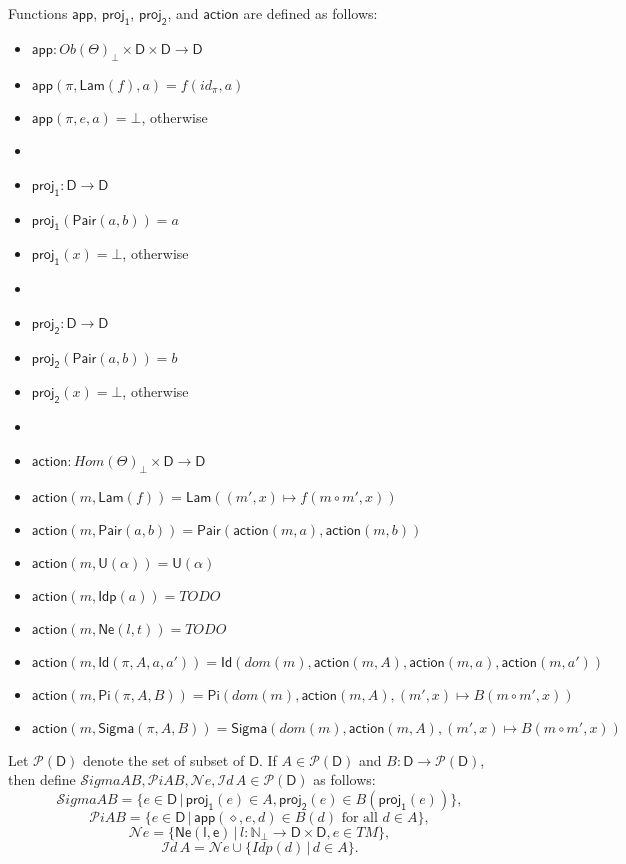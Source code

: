 \documentclass{amsart}
\theoremstyle{definition}
\theoremstyle{remark}
\newcommand{\D}{\mathsf{D}}
\newcommand{\nats}{\mathbb{N}}
\numberwithin{table}{section}
\begin{document}
Functions $\mathsf{app}$, $\mathsf{proj_1}$, $\mathsf{proj_2}$, and $\mathsf{action}$ are defined as follows:
\begin{itemize}
\item[] $\mathsf{app} : Ob(\Theta)_\bot \times \D \times \D \to \D$
\item[] $\mathsf{app}(\pi,\mathsf{Lam}(f),a) = f(id_\pi,a)$
\item[] $\mathsf{app}(\pi,e,a) = \bot$, otherwise
\item[]
\item[] $\mathsf{proj_1} : \D \to \D$
\item[] $\mathsf{proj_1}(\mathsf{Pair}(a,b)) = a$
\item[] $\mathsf{proj_1}(x) = \bot$, otherwise
\item[]
\item[] $\mathsf{proj_2} : \D \to \D$
\item[] $\mathsf{proj_2}(\mathsf{Pair}(a,b)) = b$
\item[] $\mathsf{proj_2}(x) = \bot$, otherwise
\item[]
\item[] $\mathsf{action} : Hom(\Theta)_\bot \times \D \to \D$
\item[] $\mathsf{action}(m, \mathsf{Lam}(f)) = \mathsf{Lam}((m',x) \mapsto f(m \circ m', x))$
\item[] $\mathsf{action}(m, \mathsf{Pair}(a, b)) = \mathsf{Pair}(\mathsf{action}(m, a), \mathsf{action}(m, b))$
\item[] $\mathsf{action}(m, \mathsf{U}(\alpha)) = \mathsf{U}(\alpha)$
\item[] $\mathsf{action}(m, \mathsf{Idp}(a)) = TODO$
\item[] $\mathsf{action}(m, \mathsf{Ne}(l, t)) = TODO$
\item[] $\mathsf{action}(m, \mathsf{Id}(\pi, A, a, a')) = \mathsf{Id}(dom(m), \mathsf{action}(m, A), \mathsf{action}(m, a), \mathsf{action}(m, a'))$
\item[] $\mathsf{action}(m, \mathsf{Pi}(\pi, A, B)) = \mathsf{Pi}(dom(m), \mathsf{action}(m, A), (m', x) \mapsto B(m \circ m', x))$
\item[] $\mathsf{action}(m, \mathsf{Sigma}(\pi, A, B)) = \mathsf{Sigma}(dom(m), \mathsf{action}(m, A), (m', x) \mapsto B(m \circ m', x))$
\end{itemize}

Let $\mathscr{P}(\D)$ denote the set of subset of $\D$.
If $A \in \mathscr{P}(\D)$ and $B : \D \to \mathscr{P}(\D)$, then define $\mathcal{S}igma A B, \mathcal{P}i A B, \mathcal{N}\!e, \mathcal{I}d\,A \in \mathscr{P}(\D)$ as follows:
\[ \mathcal{S}igma A B = \{ e \in \D\,|\,\mathsf{proj_1}(e) \in A, \mathsf{proj_2}(e) \in B(\mathsf{proj_1}(e)) \}, \]
\[ \mathcal{P}i A B = \{ e \in \D\,|\,\mathsf{app}(\diamond,e,d) \in B(d) \text{ for all } d \in A \}, \]
\[ \mathcal{N}\!e = \{ \mathsf{Ne(l,e)}\,|\,l : \nats_\bot \to \D \times \D, e \in TM \}, \]
\[ \mathcal{I}d\,A = \mathcal{N}\!e \cup \{ Idp(d)\,|\,d \in A \}. \]
\end{document}
